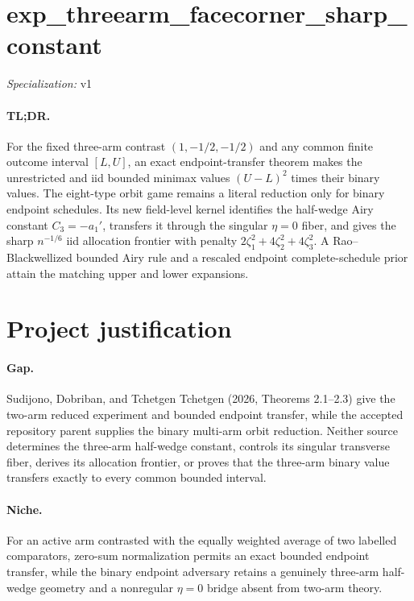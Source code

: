 \documentclass{article}
\begin{document}
\sloppy

\section*{exp\_\allowbreak{}threearm\_\allowbreak{}facecorner\_\allowbreak{}sharp\_\allowbreak{}constant}

\noindent\textit{Specialization:} v1\par

\paragraph{TL;DR.} For the fixed three-arm contrast \((1,-1/2,-1/2)\) and any common finite outcome interval \([L,U]\), an exact endpoint-transfer theorem makes the unrestricted and iid bounded minimax values \((U-L)^2\) times their binary values. The eight-type orbit game remains a literal reduction only for binary endpoint schedules. Its new field-level kernel identifies the half-wedge Airy constant \(C_3=-a_1'\), transfers it through the singular \(\eta=0\) fiber, and gives the sharp \(n^{-1/6}\) iid allocation frontier with penalty \(2\zeta_1^2+4\zeta_2^2+4\zeta_3^2\). A Rao--Blackwellized bounded Airy rule and a rescaled endpoint complete-schedule prior attain the matching upper and lower expansions.

\section{Project justification}

\paragraph{Gap.} Sudijono, Dobriban, and Tchetgen Tchetgen (2026, Theorems 2.1--2.3) give the two-arm reduced experiment and bounded endpoint transfer, while the accepted repository parent supplies the binary multi-arm orbit reduction. Neither source determines the three-arm half-wedge constant, controls its singular transverse fiber, derives its allocation frontier, or proves that the three-arm binary value transfers exactly to every common bounded interval.

\paragraph{Niche.} For an active arm contrasted with the equally weighted average of two labelled comparators, zero-sum normalization permits an exact bounded endpoint transfer, while the binary endpoint adversary retains a genuinely three-arm half-wedge geometry and a nonregular \(\eta=0\) bridge absent from two-arm theory.
\end{document}
